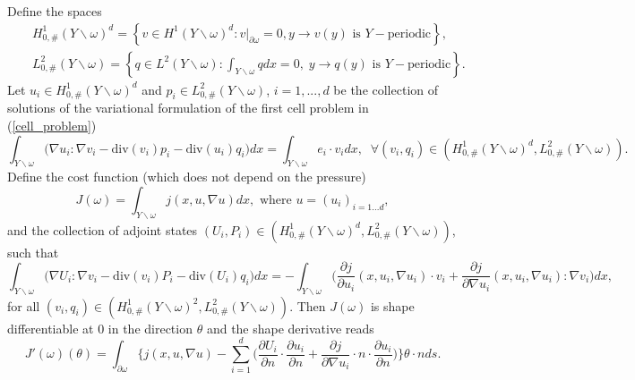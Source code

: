 \documentclass{article}
\begin{document}
{
\prop Define the spaces
\begin{eqnarray*}
&&H_{0,\#}^1(Y\backslash \omega)^d= \left\{ v\in H^1(Y\backslash \omega)^d: v|_{\partial \omega}=0, y\rightarrow v(y) \mbox{ is $Y-$periodic}\right\},\\
&&L_{0,\#}^2(Y\backslash \omega)= \left\{ q\in L^2(Y\backslash \omega): \int_{Y\backslash \omega} q dx=0,\; y\rightarrow q(y) \mbox{ is $Y-$periodic}\right\}.
\end{eqnarray*}
Let $u_i\in H_{0,\#}^1(Y\backslash \omega)^d$ and $p_i \in L^2_{0,\#}(Y\backslash \omega)$, $i=1,...,d$ be the collection of solutions of the variational formulation of the first cell problem in (\ref{cell_problem})
\begin{equation}
\label{variational_stokes}
\int_{Y\backslash \omega} \Big(\nabla u_i : \nabla v_i - \text{div}(v_i)p_i - \mbox{div}(u_i) q_i \Big)dx = \int_{Y\backslash \omega} e_i \cdot v_i dx, \;\;\forall (v_i,q_i)\in (H_{0,\#}^1(Y\backslash \omega)^d,L^2_{0,\#}(Y\backslash \omega)).
\end{equation}
Define the cost function (which does not depend on the pressure)
\begin{equation*}
J(\omega)=\int_{Y\backslash \omega} j(x,u,\nabla u)dx, \text{ where }u=(u_i)_{i=1...d},
\end{equation*}
and the collection of adjoint states $(U_i,P_i)\in (H_{0,\#}^1(Y\backslash \omega)^d,L^2_{0,\#}(Y\backslash \omega))$, such that  \begin{equation}
\label{variational_adjoint}
\int_{Y\backslash \omega} \Big(\nabla U_i : \nabla v_i -\text{div}(v_i)P_i - \mbox{div}(U_i) q_i \Big)dx = -\int_{Y\backslash \omega} \Big( \frac{\partial j}{\partial u_i}(x,u_i,\nabla u_i) \cdot v_i+ \frac{\partial j}{\partial \nabla u_i}(x,u_i,\nabla u_i):\nabla v_i\Big) dx,
\end{equation}
{for all $(v_i,q_i)\in (H_{0,\#}^1(Y\backslash \omega)^2,L^2_{0,\#}(Y\backslash \omega))$.} Then $J(\omega)$ is shape differentiable at $0$ in the direction $\theta$
and the shape derivative reads \begin{equation*}
J'(\omega)(\theta)=\int_{\partial \omega} \Big\{j(x,u,\nabla u)-\sum_{i=1}^d \Big(\frac{\partial U_i}{\partial n}\cdot \frac{\partial u_i}{\partial n}+\frac{\partial j}{\partial \nabla u_i}\cdot n \cdot \frac{\partial u_i}{\partial n} \Big)\Big\}\theta \cdot n  ds.
\end{equation*}

}
\end{document}
